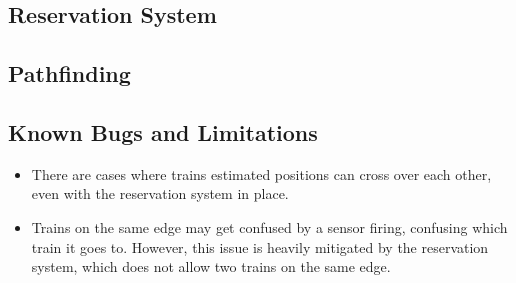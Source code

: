 \documentclass{article}
\begin{document}
\subsection{Reservation System}

\subsection{Pathfinding}

\subsection{Known Bugs and Limitations}
\begin{itemize}
  \item There are cases where trains estimated positions can cross over each other, even with the reservation system in place.
  \item Trains on the same edge may get confused by a sensor firing, confusing which train it goes to. However, this issue is heavily mitigated by the reservation system, which does not allow two trains on the same edge.
\end{itemize}
\end{document}
